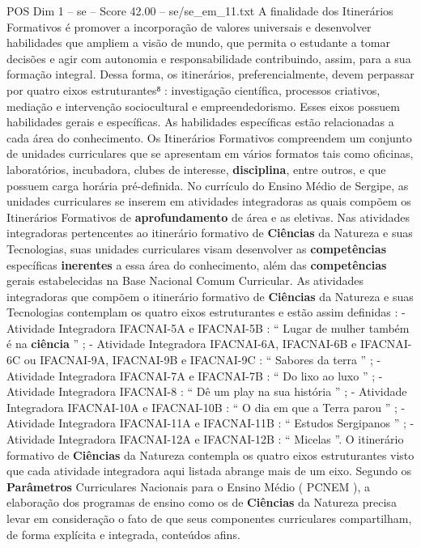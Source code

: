 \begin{textsample}{POS Dim 1 – se – Score 42.00 – se/se\_em\_11.txt}
A finalidade dos Itinerários Formativos é promover a incorporação de valores universais e desenvolver habilidades que ampliem a visão de mundo, que permita o estudante a tomar decisões e agir com autonomia e responsabilidade contribuindo, assim, para a sua formação integral.
Dessa forma, os itinerários, preferencialmente, devem perpassar por quatro eixos estruturantes⁸ : investigação científica, processos criativos, mediação e intervenção sociocultural e empreendedorismo.
Esses eixos possuem habilidades gerais e específicas.
As habilidades específicas estão relacionadas a cada área do conhecimento.
Os Itinerários Formativos compreendem um conjunto de unidades curriculares que se apresentam em vários formatos tais como oficinas, laboratórios, incubadora, clubes de interesse, \textbf{disciplina}, entre outros, e que possuem carga horária pré-definida.
No currículo do Ensino Médio de Sergipe, as unidades curriculares se inserem em atividades integradoras as quais compõem os Itinerários Formativos de \textbf{aprofundamento} de área e as eletivas.
Nas atividades integradoras pertencentes ao itinerário formativo de \textbf{Ciências} da Natureza e suas Tecnologias, suas unidades curriculares visam desenvolver as \textbf{competências} específicas \textbf{inerentes} a essa área do conhecimento, além das \textbf{competências} gerais estabelecidas na Base Nacional Comum Curricular.
As atividades integradoras que compõem o itinerário formativo de \textbf{Ciências} da Natureza e suas Tecnologias contemplam os quatro eixos estruturantes e estão assim definidas : - Atividade Integradora IFACNAI-5A e IFACNAI-5B : “ Lugar de mulher também é na \textbf{ciência} ” ; - Atividade Integradora IFACNAI-6A, IFACNAI-6B e IFACNAI-6C ou IFACNAI-9A, IFACNAI-9B e IFACNAI-9C : “ Sabores da terra ” ; - Atividade Integradora IFACNAI-7A e IFACNAI-7B : “ Do lixo ao luxo ” ; - Atividade Integradora IFACNAI-8 : “ Dê um play na sua história ” ; - Atividade Integradora IFACNAI-10A e IFACNAI-10B : “ O dia em que a Terra parou ” ; - Atividade Integradora IFACNAI-11A e IFACNAI-11B : “ Estudos Sergipanos ” ; - Atividade Integradora IFACNAI-12A e IFACNAI-12B : “ Micelas ”.
O itinerário formativo de \textbf{Ciências} da Natureza contempla os quatro eixos estruturantes visto que cada atividade integradora aqui listada abrange mais de um eixo.
Segundo os \textbf{Parâmetros} Curriculares Nacionais para o Ensino Médio ( PCNEM ), a elaboração dos programas de ensino como os de \textbf{Ciências} da Natureza precisa levar em consideração o fato de que seus componentes curriculares compartilham, de forma explícita e integrada, conteúdos afins.

\end{textsample}
